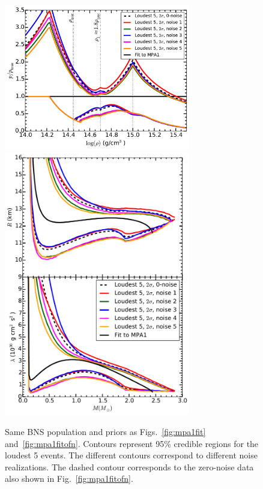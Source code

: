 \documentclass[twocolumn,prd,amssymb,aps,nofootinbib,showpacs,epsf]{revtex4}
\begin{document}
\begin{figure}[!htb]
\begin{center}
\includegraphics[width=3.2in]{LALMCMCmpa1FitTaylorF2CompareNoiseperror.pdf}\\
\includegraphics[width=3.2in]{LALMCMCmpa1FitTaylorF2CompareNoiseRadiuslambda.pdf}\caption{Same BNS population and priors as Figs.~\ref{fig:mpa1fit} and~\ref{fig:mpa1fitofn}. Contours represent 95\% credible regions for the loudest 5 events. The different contours correspond to different noise realizations. The dashed contour corresponds to the zero-noise data also shown in Fig.~\ref{fig:mpa1fitofn}.}
\label{fig:noise}
\end{center}
\end{figure}

\end{document}

